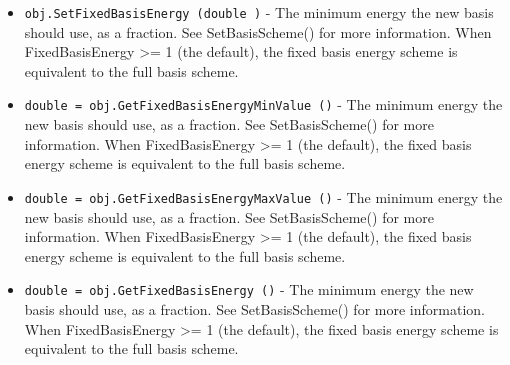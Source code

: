 \begin{itemize}
\item  \verb|obj.SetFixedBasisEnergy (double )| -  The minimum energy the new basis should use, as a fraction. See SetBasisScheme() for more information.
 When FixedBasisEnergy >= 1 (the default), the fixed basis energy scheme is equivalent to the full basis scheme.

\item  \verb|double = obj.GetFixedBasisEnergyMinValue ()| -  The minimum energy the new basis should use, as a fraction. See SetBasisScheme() for more information.
 When FixedBasisEnergy >= 1 (the default), the fixed basis energy scheme is equivalent to the full basis scheme.

\item  \verb|double = obj.GetFixedBasisEnergyMaxValue ()| -  The minimum energy the new basis should use, as a fraction. See SetBasisScheme() for more information.
 When FixedBasisEnergy >= 1 (the default), the fixed basis energy scheme is equivalent to the full basis scheme.

\item  \verb|double = obj.GetFixedBasisEnergy ()| -  The minimum energy the new basis should use, as a fraction. See SetBasisScheme() for more information.
 When FixedBasisEnergy >= 1 (the default), the fixed basis energy scheme is equivalent to the full basis scheme.

\end{itemize}
